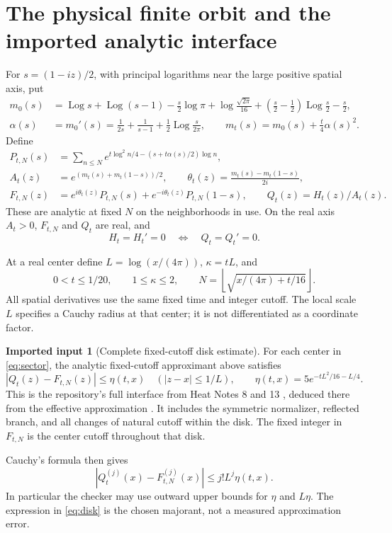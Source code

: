 \documentclass[11pt]{article}
\numberwithin{equation}{section}
\theoremstyle{definition}
\newtheorem{importedinput}[theorem]{Imported input}
\theoremstyle{remark}
\DeclareMathOperator{\Log}{Log}
\begin{document}
\section{The physical finite orbit and the imported analytic interface}
\label{sec:orbit}
For $s=(1-iz)/2$, with principal logarithms near the large positive
spatial axis, put
\begin{align}
 m_0(s)&=\Log s+\Log(s-1)-\frac s2\log\pi
       +\log\frac{\sqrt{2\pi}}{16}
       +\left(\frac s2-\frac12\right)\Log\frac s2-\frac s2,\nonumber\\
 \alpha(s)&=m_0'(s)=\frac1{2s}+\frac1{s-1}
                        +\frac12\Log\frac{s}{2\pi},\qquad
 m_t(s)=m_0(s)+\frac t4\alpha(s)^2.\label{eq:normalizer-data}
\end{align}
Define
\begin{align}
 P_{t,N}(s)&=\sum_{n\le N}
 e^{t\log^2n/4-(s+t\alpha(s)/2)\log n},\nonumber\\
 A_t(z)&=e^{(m_t(s)+m_t(1-s))/2},\qquad
 \theta_t(z)=\frac{m_t(s)-m_t(1-s)}{2i},\\
 F_{t,N}(z)&=e^{i\theta_t(z)}P_{t,N}(s)
               +e^{-i\theta_t(z)}P_{t,N}(1-s),\qquad
 Q_t(z)=H_t(z)/A_t(z).\nonumber
\end{align}
These are analytic at fixed $N$ on the neighborhoods in use. On the real
axis $A_t>0$, $F_{t,N}$ and $Q_t$ are real, and
\begin{equation}
 H_t=H_t'=0\quad\Longleftrightarrow\quad Q_t=Q_t'=0.
 \label{eq:joint-equivalence}
\end{equation}

At a real center define $L=\log(x/(4\pi))$, $\kappa=tL$, and
\begin{equation}
 0<t\le1/20,\qquad 1\le\kappa\le2,\qquad
 N=\left\lfloor\sqrt{x/(4\pi)+t/16}\right\rfloor.
 \label{eq:sector}
\end{equation}
All spatial derivatives use the same fixed time and integer cutoff.
The local scale $L$ specifies a Cauchy radius at that center; it is not
differentiated as a coordinate factor.

\begin{importedinput}[Complete fixed-cutoff disk estimate]
\label{input:disk}
For each center in \eqref{eq:sector}, the analytic fixed-cutoff
approximant above satisfies
\begin{equation}
 |Q_t(z)-F_{t,N}(z)|\le\eta(t,x)
 \quad (|z-x|\le1/L),\qquad
 \eta(t,x)=5e^{-tL^2/16-L/4}.
 \label{eq:disk}
\end{equation}
This is the repository's full interface from Heat Notes 8 and 13
\cite{heatinterface}, deduced there from the effective approximation
\cite{polymath}. It includes the symmetric normalizer, reflected branch,
and all changes of natural cutoff within the disk. The fixed integer in
$F_{t,N}$ is the center cutoff throughout that disk.
\end{importedinput}
Cauchy's formula then gives
\begin{equation}
 |Q_t^{(j)}(x)-F_{t,N}^{(j)}(x)|\le j!L^j\eta(t,x).
 \label{eq:cauchy}
\end{equation}
In particular the checker may use outward upper bounds for $\eta$ and
$L\eta$. The expression in \eqref{eq:disk} is the chosen majorant,
not a measured approximation error.
\end{document}
